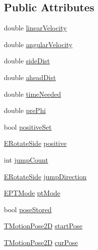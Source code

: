 \subsection*{Public Attributes}
\begin{DoxyCompactItemize}
\item 
double \mbox{\hyperlink{structmotion_1_1TMotion_aeda5c209f0c5d82440b41c677d3ea529}{linear\+Velocity}}
\item 
double \mbox{\hyperlink{structmotion_1_1TMotion_afe8d2e8d60f8792e3910f52247d63cdc}{angular\+Velocity}}
\item 
double \mbox{\hyperlink{structmotion_1_1TMotion_a17243eb4c7f2ea4f52532ca537f51fc4}{side\+Dist}}
\item 
double \mbox{\hyperlink{structmotion_1_1TMotion_a367ffdd10f1094a1f263cbb43f341cd8}{ahead\+Dist}}
\item 
double \mbox{\hyperlink{structmotion_1_1TMotion_a927510756a7eb9cacae2fcea8ded4dc5}{time\+Needed}}
\item 
double \mbox{\hyperlink{structmotion_1_1TMotion_a9666f9ac141497a4fe324431c24b2f16}{pre\+Phi}}
\item 
bool \mbox{\hyperlink{structmotion_1_1TMotion_a1e5e34bc2826af1f1655ef0e57d598c7}{positive\+Set}}
\item 
\mbox{\hyperlink{motionEnums_8h_a03a5344cd29a761a4b7dcaf1df3c3c85}{E\+Rotate\+Side}} \mbox{\hyperlink{structmotion_1_1TMotion_ad1c88e25a3f1e71b94e6173a64f6212a}{positive}}
\item 
int \mbox{\hyperlink{structmotion_1_1TMotion_a9080c7c722cd68cab5ecd832e2ceca82}{jump\+Count}}
\item 
\mbox{\hyperlink{motionEnums_8h_a03a5344cd29a761a4b7dcaf1df3c3c85}{E\+Rotate\+Side}} \mbox{\hyperlink{structmotion_1_1TMotion_a2b174cdd1ddccc5fc08d04f074a45686}{jump\+Direction}}
\item 
\mbox{\hyperlink{motionEnums_8h_a183cd5b7c370a05cb3b44fb54e0fee66}{E\+P\+T\+Mode}} \mbox{\hyperlink{structmotion_1_1TMotion_afbcc18b70d7d5b75906addd67e698bbf}{pt\+Mode}}
\item 
bool \mbox{\hyperlink{structmotion_1_1TMotion_a138af2063ec400b8031da3cb019d4723}{pose\+Stored}}
\item 
\mbox{\hyperlink{structmotion_1_1TMotionPose2D}{T\+Motion\+Pose2D}} \mbox{\hyperlink{structmotion_1_1TMotion_a9fbd5c971ef085ed45054abd82b650eb}{start\+Pose}}
\item 
\mbox{\hyperlink{structmotion_1_1TMotionPose2D}{T\+Motion\+Pose2D}} \mbox{\hyperlink{structmotion_1_1TMotion_a19c4b369e9e8c9c290a86a1a4ead53a0}{cur\+Pose}}

\end{DoxyCompactItemize}
